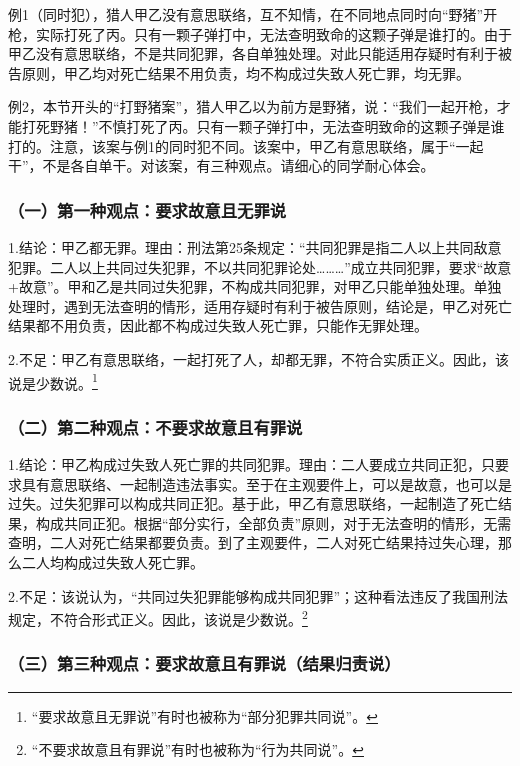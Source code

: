 例1（同时犯），猎人甲乙没有意思联络，互不知情，在不同地点同时向“野猪”开枪，实际打死了丙。只有一颗子弹打中，无法查明致命的这颗子弹是谁打的。由于甲乙没有意思联络，不是共同犯罪，各自单独处理。对此只能适用存疑时有利于被告原则，甲乙均对死亡结果不用负责，均不构成过失致人死亡罪，均无罪。

例2，本节开头的“打野猪案”，猎人甲乙以为前方是野猪，说：“我们一起开枪，才能打死野猪！”不慎打死了丙。只有一颗子弹打中，无法查明致命的这颗子弹是谁打的。注意，该案与例1的同时犯不同。该案中，甲乙有意思联络，属于“一起干”，不是各自单干。对该案，有三种观点。请细心的同学耐心体会。

\subsubsection*{（一）第一种观点：要求故意且无罪说}

1.结论：甲乙都无罪。理由：刑法第25条规定：“共同犯罪是指二人以上共同敌意犯罪。二人以上共同过失犯罪，不以共同犯罪论处………”成立共同犯罪，要求“故意+故意”。甲和乙是共同过失犯罪，不构成共同犯罪，对甲乙只能单独处理。单独处理时，遇到无法查明的情形，适用存疑时有利于被告原则，结论是，甲乙对死亡结果都不用负责，因此都不构成过失致人死亡罪，只能作无罪处理。

2.不足：甲乙有意思联络，一起打死了人，却都无罪，不符合实质正义。因此，该说是少数说。\footnote{“要求故意且无罪说”有时也被称为“部分犯罪共同说”。}

\subsubsection*{（二）第二种观点：不要求故意且有罪说}

1.结论：甲乙构成过失致人死亡罪的共同犯罪。理由：二人要成立共同正犯，只要求具有意思联络、一起制造违法事实。至于在主观要件上，可以是故意，也可以是过失。过失犯罪可以构成共同正犯。基于此，甲乙有意思联络，一起制造了死亡结果，构成共同正犯。根据“部分实行，全部负责”原则，对于无法查明的情形，无需查明，二人对死亡结果都要负责。到了主观要件，二人对死亡结果持过失心理，那么二人均构成过失致人死亡罪。

2.不足：该说认为，“共同过失犯罪能够构成共同犯罪”；这种看法违反了我国刑法规定，不符合形式正义。因此，该说是少数说。\footnote{“不要求故意且有罪说”有时也被称为“行为共同说”。}

\subsubsection*{（三）第三种观点：要求故意且有罪说（结果归责说）}

